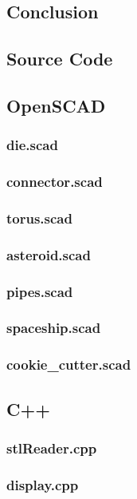 \documentclass[12pt]{article}
\begin{document}
\begin{doublespace}
\section{Conclusion}

\newpage
\end{doublespace}
\begin{onehalfspace}
\section{Source Code}
\subsection{OpenSCAD}
\subsubsection{die.scad}
\subsubsection{connector.scad}
\subsubsection{torus.scad}
\subsubsection{asteroid.scad}
\subsubsection{pipes.scad}
\subsubsection{spaceship.scad}
\subsubsection{cookie\_cutter.scad}

\subsection{C++}
\subsubsection{stlReader.cpp}
% 
\subsubsection{display.cpp}
% 

\end{onehalfspace}
\end{document}
